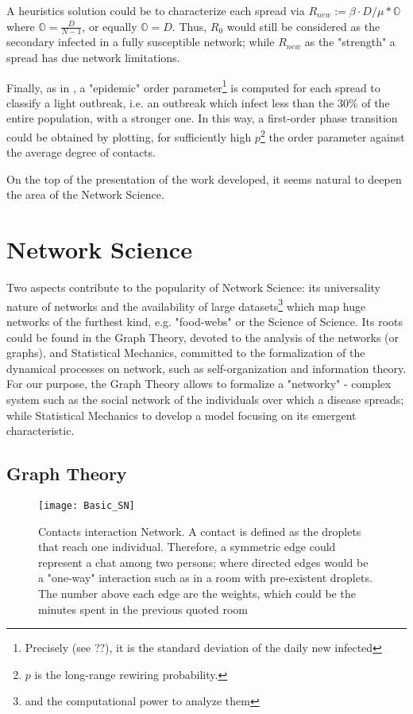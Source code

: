 \documentclass[a4paper,12pt,twoside]{book} %
\theoremstyle{definition}
\begin{document}
A heuristics solution could be to characterize each spread via $R_{new} := \beta \cdot D/\mu * \mathbb{O}$ where $\mathbb{O} = \frac{D}{N-1}$, or equally $\mathbb{O} = D$. Thus, $R_0$ would still be considered as the secondary infected in a fully susceptible network; while $R_{new}$ as the "strength" a spread has due network limitations.

Finally, as in \cite{Thurner::NetBasedExpl}, a "epidemic" order parameter\footnote{Precisely (see ??), it is the standard deviation of the daily new infected} is computed for each spread to classify a light outbreak, i.e. an outbreak which infect less than the $30\%$ of the entire population, with a stronger one. In this way, a first-order phase transition could be obtained by plotting, for sufficiently high $p$\footnote{$p$ is the long-range rewiring probability.} the order parameter against the average degree of contacts.

On the top of the presentation of the work developed, it seems natural to deepen the area of the Network Science.


\section{Network Science}

Two aspects contribute to the popularity of Network Science: its universality nature of networks and the availability of large datasets\footnote{and the computational power to analyze them} which map huge networks of the furthest kind, e.g. "food-webs" or the Science of Science.
Its roots could be found in the Graph Theory, devoted to the analysis of the networks (or graphs), and Statistical Mechanics, committed to the formalization of the dynamical processes on network, such as self-organization and information theory.
For our purpose, the Graph Theory allows to formalize a "networky" - complex system such as the social network of the individuals over which a disease spreads; while Statistical Mechanics to develop a model focusing on its emergent characteristic.

\subsection{Graph Theory}
\label{sec:GraphTheory}
\begin{figure}[htbp]
	\centering
	\texttt{[image: Basic\_SN]}
	\caption{Contacts interaction Network. A contact is defined as the droplets that reach one individual. Therefore, a symmetric edge could represent a chat among two persons; where directed edges would be a "one-way" interaction such as in a room with pre-existent droplets. The number above each edge are the weights, which could be the minutes spent in the previous quoted room}
	\label{fig:basicSN}
\end{figure}
\end{document}

